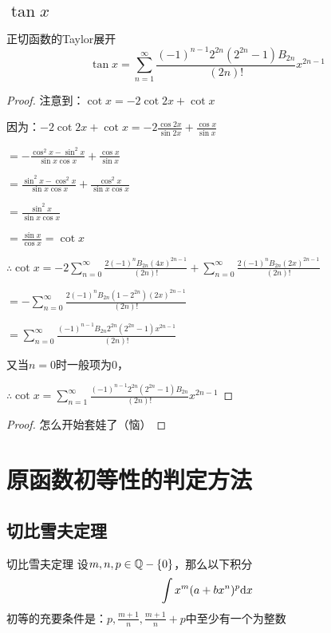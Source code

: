 \documentclass[12pt, a4paper, oneside, UTF8]{ctexbook}
\begin{document}
		\subsection{$\tan x$}
			\begin{them}{正切函数的Taylor展开}{}
				\begin{equation}
					\tan x = \sum\limits_{n=1}^{\infty} \frac{(-1)^{n-1}2^{2n}(2^{2n}-1)B_{2n}}{(2n)!}x^{2n-1}
				\end{equation}
			\end{them}
			\begin{proof}
				注意到：$\cot x = -2 \cot 2x +\cot x$
				
				因为：$-2\cot 2x+\cot x = -2\frac{\cos 2x}{\sin 2x}+\frac{\cos x}{\sin x}$
				
				$=-\frac{\cos^2 x-\sin^2 x}{\sin x\cos x}+\frac{\cos x}{\sin x}$
				
				$=\frac{\sin^2 x-\cos^2 x}{\sin x\cos x}+\frac{\cos^2 x}{\sin x\cos x}$
				
				$=\frac{\sin^2 x}{\sin x\cos x}$
				
				$=\frac{\sin x}{\cos x}=\cot x$
				
				$\therefore \cot x = -2\sum\limits_{n=0}^{\infty}\frac{2(-1)^n B_{2n} (4x)^{2n-1}}{(2n)!}+\sum\limits_{n=0}^{\infty}\frac{2(-1)^n B_{2n} (2x)^{2n-1}}{(2n)!} $
				
				$=-\sum\limits_{n=0}^{\infty}\frac{2(-1)^n B_{2n} (1-2^{2n}) (2x)^{2n-1}}{(2n)!}$
				
				$=\sum\limits_{n=0}^{\infty}\frac{(-1)^{n-1} B_{2n} 2^{2n}(2^{2n}-1) x^{2n-1}}{(2n)!}$
				
				又当$n=0$时一般项为0，
				
				$\therefore \cot x = \sum\limits_{n=1}^{\infty}\frac{(-1)^{n-1} 2^{2n}(2^{2n}-1) B_{2n}}{(2n)!}  x^{2n-1}$
			\end{proof}
			\begin{proof}
				怎么开始套娃了（恼）
			\end{proof}
	
	\section{原函数初等性的判定方法}
		\subsection{切比雪夫定理}
			\begin{them}{切比雪夫定理}{}
				设$m,n,p\in \mathbb{Q}-\{0\}$，那么以下积分
				\begin{equation}
					\int x^m(a+bx^n)^p \mathrm{d} x
				\end{equation}
				初等的充要条件是：$p,\frac{m+1}{n},\frac{m+1}{n}+p$中至少有一个为整数
			\end{them}
\end{document}
